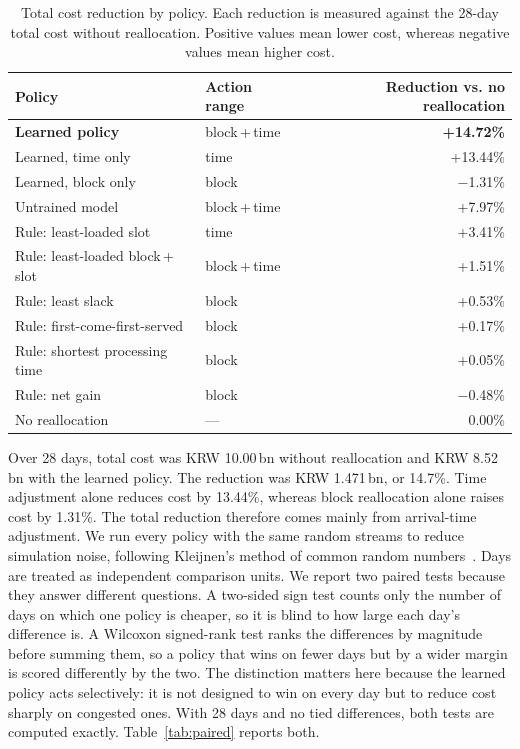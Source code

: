 \begin{table}[tbp]
\centering
\caption{Total cost reduction by policy. Each reduction is measured
against the 28-day total cost without reallocation. Positive values mean
lower cost, whereas negative values mean higher cost.}
\label{tab:policies}
\small
\begin{tabular}{@{}l l@{\hspace{2em}} r@{}}
\toprule
Policy & Action range & Reduction vs. no reallocation \\
\midrule
\textbf{Learned policy} & block\,+\,time & \textbf{+14.72\%} \\
Learned, time only & time & +13.44\% \\
Learned, block only & block & $-$1.31\% \\
\midrule
Untrained model & block\,+\,time & +7.97\% \\
\midrule
Rule: least-loaded slot & time & +3.41\% \\
Rule: least-loaded block\,+\,slot & block\,+\,time & +1.51\% \\
Rule: least slack & block & +0.53\% \\
Rule: first-come-first-served & block & +0.17\% \\
Rule: shortest processing time & block & +0.05\% \\
Rule: net gain & block & $-$0.48\% \\
\midrule
No reallocation & --- & 0.00\% \\
\bottomrule
\end{tabular}
\end{table}
Over 28 days, total cost was KRW 10.00\,bn without reallocation and KRW
8.52\,bn with the learned policy. The reduction was KRW 1.471\,bn, or
14.7\%. Time adjustment alone reduces cost by 13.44\%, whereas block
reallocation alone raises cost by 1.31\%. The total reduction therefore
comes mainly from arrival-time adjustment.
We run every policy with the same random streams to reduce simulation
noise, following Kleijnen's method of common random numbers~\cite{ref22}.
Days are treated as independent comparison units. We report two paired
tests because they answer different questions. A two-sided sign test
counts only the number of days on which one policy is cheaper, so it is
blind to how large each day's difference is. A Wilcoxon signed-rank test
ranks the differences by magnitude before summing them, so a policy that
wins on fewer days but by a wider margin is scored differently by the
two. The distinction matters here because the learned policy acts
selectively: it is not designed to win on every day but to reduce cost
sharply on congested ones. With 28 days and no tied differences, both
tests are computed exactly. Table~\ref{tab:paired} reports both.

